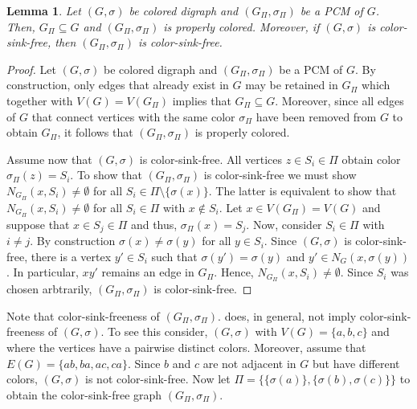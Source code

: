 \documentclass[final,3p,times]{elsarticle}
\newtheorem{lemma}[theorem]{Lemma}%
\begin{document}
\begin{lemma}\label{lem:basicsPCM}
  Let $(G,\sigma)$ be colored digraph and $(G_{\Pi},\sigma_{\Pi})$ 
  be a PCM of $G$. Then, $G_\Pi  \subseteq G$ and 
  $(G_{\Pi},\sigma_{\Pi})$ is properly colored. 
  Moreover, if $(G,\sigma)$ is color-sink-free, 
  then $(G_{\Pi},\sigma_{\Pi})$ is color-sink-free.
\end{lemma}
\begin{proof}
 	Let $(G,\sigma)$ be colored digraph and $(G_{\Pi},\sigma_{\Pi})$ 
  be a PCM of $G$. By construction, only edges that already
  exist in $G$ may be retained in $G_\Pi$ which together
  with $V(G) = V(G_\Pi)$ implies that $G_\Pi  \subseteq G$.
  Moreover, since all edges of $G$ that connect vertices 
  with the same color $\sigma_\Pi$ have been removed
  from $G$ to obtain $G_\Pi$, it follows that 
  $(G_{\Pi},\sigma_{\Pi})$ is properly colored. 
  
  Assume now that $(G,\sigma)$ is color-sink-free. 
  All vertices $z\in S_i\in \Pi$ obtain color
 $\sigma_\Pi(z)=S_i$. To show that $(G_\Pi,\sigma_\Pi)$ is color-sink-free we
	must show $N_{G_\Pi}(x,S_i)\neq \emptyset$ for all $S_i\in \Pi\setminus
	\{\sigma(x)\}$. The latter is equivalent to show that $N_{G_\Pi}(x,S_i)\neq
	\emptyset$ for all $S_i\in \Pi$ with $x\notin S_i$. Let $x\in V(G_\Pi)=V(G)$
	and suppose that $x\in S_j\in \Pi$ and thus, $\sigma_\Pi(x) = S_j$. Now,
	consider $S_i\in \Pi$ with $i\neq j$. By construction $\sigma(x)\neq
	\sigma(y)$ for all $y\in S_i$. Since $(G,\sigma)$ is color-sink-free, there
	is a vertex $y'\in S_i$ such that $\sigma(y')=\sigma(y)$ and $y'\in
	N_G(x,\sigma(y))$. In particular, $xy'$ remains an edge in $G_\Pi$. Hence,
	$N_{G_\Pi}(x,S_i)\neq \emptyset$. Since $S_i$ was chosen arbtrarily,
	$(G_\Pi,\sigma_\Pi)$ is color-sink-free.
 \end{proof}

Note that color-sink-freeness of  $(G_{\Pi},\sigma_{\Pi})$.
does, in general, not imply  color-sink-freeness of  $(G,\sigma)$.
To see this consider,  $(G,\sigma)$ with $V(G) = \{a,b,c\}$
and where the vertices have a pairwise distinct colors. 
Moreover, assume that $E(G) = \{ab,ba,ac,ca\}$. 
Since $b$ and $c$ are not adjacent in $G$ but have different
colors,  $(G,\sigma)$ is not color-sink-free. 
Now let $\Pi = \{\{\sigma(a)\},\{\sigma(b),\sigma(c)\}\}$
to obtain the color-sink-free graph $(G_{\Pi},\sigma_{\Pi})$.
\end{document}
